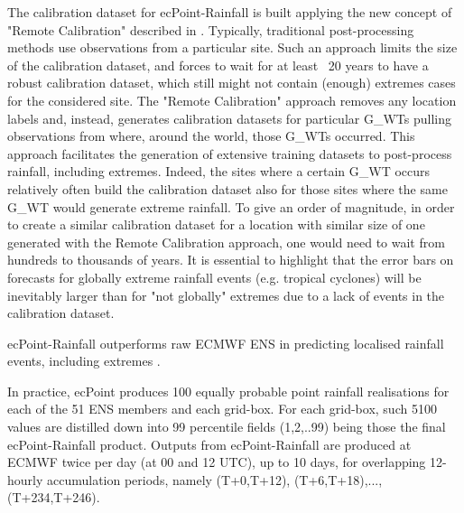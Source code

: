 \documentclass[twocol]{ametsocV5} %
\begin{document}
The calibration dataset for ecPoint-Rainfall is built applying the new concept of "Remote Calibration" described in \citet{Hewson2020a}. Typically, traditional post-processing methods use observations from a particular site. Such an approach limits the size of the calibration dataset, and forces to wait for at least ~20 years to have a robust calibration dataset, which still might not contain (enough) extremes cases for the considered site. The "Remote Calibration" approach removes any location labels and, instead, generates calibration datasets for particular G\_WTs pulling observations from where, around the world, those G\_WTs occurred. This approach facilitates the generation of extensive training datasets to post-process rainfall, including extremes. Indeed, the sites where a certain G\_WT occurs relatively often build the calibration dataset also for those sites where the same G\_WT would generate extreme rainfall. To give an order of magnitude, in order to create a similar calibration dataset for a location with similar size of one generated with the Remote Calibration approach, one would need to wait from hundreds to thousands of years. It is essential to highlight that the error bars on forecasts for globally extreme rainfall events (e.g. tropical cyclones) will be inevitably larger than for "not globally" extremes due to a lack of events in the calibration dataset. \par
 ecPoint-Rainfall outperforms raw ECMWF ENS in predicting localised rainfall events, including extremes \citet{Hewson2020a}. \par
In practice, ecPoint produces 100 equally probable point rainfall realisations for each of the 51 ENS members and each grid-box. For each grid-box, such 5100 values are distilled down into 99 percentile fields (1,2,..99) being those the final ecPoint-Rainfall product. Outputs from ecPoint-Rainfall are produced at ECMWF twice per day (at 00 and 12 UTC), up to 10 days, for overlapping 12-hourly accumulation periods, namely (T+0,T+12), (T+6,T+18),...,(T+234,T+246).


\end{document}
